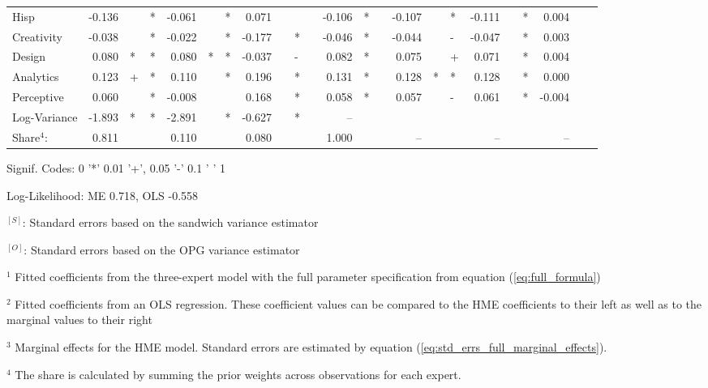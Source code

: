 \documentclass[12pt]{article}
\theoremstyle{definition}
\begin{document}
\begin{landscape}
\begin{table}
\begin{threeparttable}
\begin{tabular}[l]{l r l l r l l r l l c r l c r l l r l l r l l}
  Hisp                  & -0.136 &   & * & -0.061 &    & * &  0.071 &    &   && -0.106 & *     && -0.107 &   & *    & -0.111 &    & *   &  0.004 &   &     \\
  Creativity            & -0.038 &   & * & -0.022 &    & * & -0.177 &    & * && -0.046 & *     && -0.044 &   & -    & -0.047 &    & *   &  0.003 &   &     \\
  Design                &  0.080 & * & * &  0.080 & *  & * & -0.037 &    & - &&  0.082 & *     &&  0.075 &   & +    &  0.071 &    & *   &  0.004 &   &     \\
  Analytics             &  0.123 & + & * &  0.110 &    & * &  0.196 &    & * &&  0.131 & *     &&  0.128 & * & *    &  0.128 &    & *   &  0.000 &   &     \\
  Perceptive            &  0.060 &   & * & -0.008 &    &   &  0.168 &    & * &&  0.058 & *     &&  0.057 &   & -    &  0.061 &    & *   & -0.004 &   &     \\
  Log-Variance          & -1.893 & * & * & -2.891 &    & * & -0.627 &    & * &&  --    &       &&        &   &      &        &    &     &        &   &     \\
                        \cmidrule(l){2-4} \cmidrule(l){5-7} \cmidrule(l){8-10} \cmidrule(l){12-13} \cmidrule(l){15-17} \cmidrule(l){18-20} \cmidrule(l){21-23}
  Share$^{4}$:          & 0.811  &   &   & 0.110  &    &   &  0.080 &    &   &&  1.000 &       &&  --    &   &      &  --    &    &     &  --    &   &     \\
  \hline
        \end{tabular}
        \begin{tablenotes}
          \item Signif. Codes: 0 '*' 0.01 '+', 0.05 '-' 0.1 ' ' 1
          \item Log-Likelihood: ME 0.718, OLS -0.558
          \item $^{[S]}$: Standard errors based on the sandwich variance estimator
          \item $^{[O]}$: Standard errors based on the OPG variance estimator
          \item $^{1}$ Fitted coefficients from the three-expert model with the full parameter specification from equation (\ref{eq:full_formula})
          \item $^{2}$ Fitted coefficients from an OLS regression. These coefficient values can be compared to the HME coefficients to their left as well as to the marginal values to their right
          \item $^{3}$ Marginal effects for the HME model. Standard errors are estimated by equation (\ref{eq:std_errs_full_marginal_effects}).
          \item $^{4}$ The share is calculated by summing the prior weights across observations for each expert.
        \end{tablenotes} \label{tbl:3W_full_regressions_results}
      \end{threeparttable}
  \end{table}
  \end{landscape}
  
\end{document}
